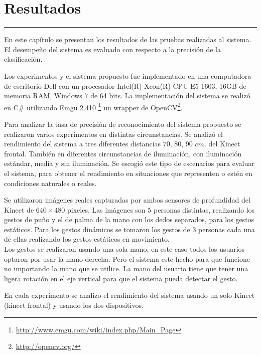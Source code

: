 \chapter{Resultados}\label{capit:cap5}
\vspace{-2.0325ex}%
\noindent
\rule{\textwidth}{0.5pt}
\vspace{-5.5ex}%
\newcommand{\pushline}{\Indp}%

En este capítulo se presentan los resultados de las pruebas realizadas al sistema. El desempeño del sistema es evaluado con respecto a la precisi\'on de la clasificación.   

Los experimentos y el sistema propuesto fue implementado en una computadora de escritorio Dell con un procesador Intel(R) Xeon(R) CPU E5-1603, 16GB de memoria RAM, Windows 7 de 64 bits. La implementación del sistema se realizó en C\# utilizando Emgu 2.410 \footnote{\url{http://www.emgu.com/wiki/index.php/Main\_Page}} un wrapper de OpenCV\footnote{\url{http://opencv.org/}}. 

Para analizar la tasa de precisión de reconocimiento del sistema propuesto se realizaron varios experimentos en distintas circunstancias. Se analizó el rendimiento del sistema a tres diferentes distancias $70$, $80$, $90$ $cm.$ del Kinect frontal. También en diferentes circunstancias de iluminación, con iluminación estándar, media y sin iluminación. Se escogió este tipo de escenarios para evaluar el sistema, para obtener el rendimiento en situaciones que representen o estén en condiciones naturales o reales.

Se utilizaron imágenes reales capturadas por ambos sensores de profundidad del Kinect de $640 \times 480$ pixeles. Las imágenes son $5$ personas distintas, realizando los gestos de puño y el de palma de la mano con los dedos separados, para los gestos estáticos. Para los gestos dinámicos se tomaron los gestos de $3$ personas cada una de ellas realizando los gestos estáticos en movimiento.\\
Los gestos se realizaron usando una sola mano, en este caso todos los usuarios optaron por usar la mano derecha. Pero el sistema este hecho para que funcione no importando la mano que se utilice. La mano del usuario tiene que tener una ligera rotación en el eje vertical para que el sistema pueda detectar el gesto.

En cada experimento se analizo el rendimiento del sistema usando un solo Kinect (kinect frontal) y usando los dos dispositivos.  




